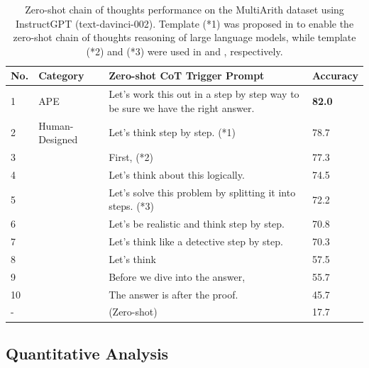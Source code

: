 \begin{table}[H]
\centering
\caption{Zero-shot chain of thoughts performance on the MultiArith \citep{roy2016solving} dataset using InstructGPT (text-davinci-002). Template (*1) was proposed in \citet{kojima2022large} to enable the zero-shot chain of thoughts reasoning of large language models, while template (*2) and (*3) were used in \citet{ahn2022can} and \citet{reynolds2021prompt}, respectively. }\label{tab:cot-arith}
\begin{tabular}{m{1cm}m{2.5cm}m{6cm}m{2cm}}
\toprule
No.&Category&Zero-shot CoT Trigger Prompt&Accuracy \\
\midrule
1&APE&Let's work this out in a step by step way to be sure we have the right answer.&\textbf{82.0}\\
\midrule
2&Human-Designed&Let's think step by step. (*1)&78.7 \\
3&&First, (*2)&77.3 \\
4&&Let's think about this logically. &74.5 \\
5&&Let's solve this problem by splitting it into steps. (*3)& 72.2\\
6&&Let's be realistic and think step by step. & 70.8\\
7&&Let's think like a detective step by step. & 70.3\\
8&&Let's think & 57.5\\
9&&Before we dive into the answer, & 55.7\\
10&&The answer is after the proof. & 45.7\\
\midrule
-&&(Zero-shot) & 17.7\\
\bottomrule
\end{tabular}
\vspace{-0.2cm}
\label{tab:template_study}
\end{table}

\clearpage
\newpage
\subsection{Quantitative Analysis}

